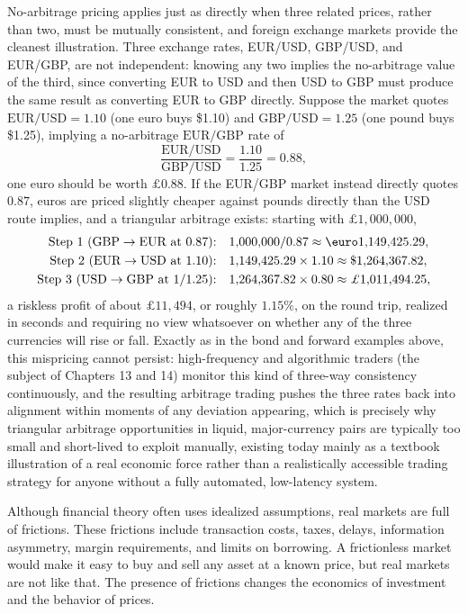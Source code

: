 \documentclass[../ai_in_finance]{subfiles}
\begin{document}
No-arbitrage pricing applies just as directly when three related prices, rather than two, must be mutually consistent, and foreign exchange markets provide the cleanest illustration. Three exchange rates, EUR/USD, GBP/USD, and EUR/GBP, are not independent: knowing any two implies the no-arbitrage value of the third, since converting EUR to USD and then USD to GBP must produce the same result as converting EUR to GBP directly. Suppose the market quotes $\text{EUR/USD} = 1.10$ (one euro buys \$1.10) and $\text{GBP/USD} = 1.25$ (one pound buys \$1.25), implying a no-arbitrage $\text{EUR/GBP}$ rate of
\begin{equation*}
\frac{\text{EUR/USD}}{\text{GBP/USD}} = \frac{1.10}{1.25} = 0.88,
\end{equation*}
one euro should be worth $\pounds0.88$. If the EUR/GBP market instead directly quotes $0.87$, euros are priced slightly cheaper against pounds directly than the USD route implies, and a triangular arbitrage exists: starting with $\pounds1{,}000{,}000$,
\begin{align*}
\text{Step 1 (GBP} \to \text{EUR at } 0.87\text{):} &\quad 1{,}000{,}000 / 0.87 \approx \text{\euro}1{,}149{,}425.29, \\
\text{Step 2 (EUR} \to \text{USD at } 1.10\text{):} &\quad 1{,}149{,}425.29 \times 1.10 \approx \$1{,}264{,}367.82, \\
\text{Step 3 (USD} \to \text{GBP at } 1/1.25\text{):} &\quad 1{,}264{,}367.82 \times 0.80 \approx \pounds1{,}011{,}494.25,
\end{align*}
a riskless profit of about $\pounds11{,}494$, or roughly $1.15\%$, on the round trip, realized in seconds and requiring no view whatsoever on whether any of the three currencies will rise or fall. Exactly as in the bond and forward examples above, this mispricing cannot persist: high-frequency and algorithmic traders (the subject of Chapters 13 and 14) monitor this kind of three-way consistency continuously, and the resulting arbitrage trading pushes the three rates back into alignment within moments of any deviation appearing, which is precisely why triangular arbitrage opportunities in liquid, major-currency pairs are typically too small and short-lived to exploit manually, existing today mainly as a textbook illustration of a real economic force rather than a realistically accessible trading strategy for anyone without a fully automated, low-latency system.

Although financial theory often uses idealized assumptions, real markets are full of frictions. These frictions include transaction costs, taxes, delays, information asymmetry, margin requirements, and limits on borrowing. A frictionless market would make it easy to buy and sell any asset at a known price, but real markets are not like that. The presence of frictions changes the economics of investment and the behavior of prices.
\end{document}
